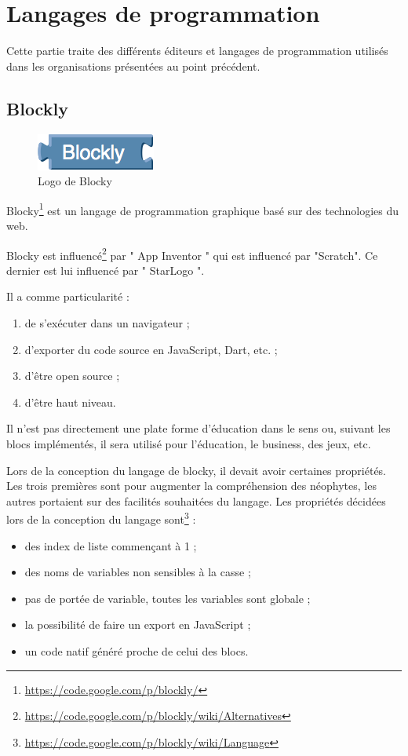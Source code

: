 ﻿\section{Langages de programmation}
Cette partie traite des différents éditeurs et langages de programmation utilisés dans les organisations présentées au point précédent.
\subsection{Blockly}
\label{blockly}
\begin{figure}[!h]
  \begin{center}
    \includegraphics[scale=0.5]{content/5-related_work/images/blocky}
    \caption{Logo de Blocky}
    \label{fig:blocky}
  \end{center}
\end{figure}
Blocky\footnote{\url{https://code.google.com/p/blockly/}} est un langage de programmation graphique basé sur des technologies du web. 

Blocky est influencé\footnote{\url{https://code.google.com/p/blockly/wiki/Alternatives}} par " App Inventor " qui est influencé par "Scratch". Ce dernier est lui influencé par " StarLogo ".

Il a comme particularité :
\begin{enumerate}
\item de s'exécuter dans un navigateur ;
\item d'exporter du code source en JavaScript, Dart, etc. ;
\item d'être open source ;
\item d'être haut niveau.
\end{enumerate}

Il n'est pas directement une plate forme d'éducation dans le sens ou, suivant les blocs implémentés, il sera utilisé pour l'éducation, le business, des jeux, etc.

Lors de la conception du langage de blocky, il devait avoir certaines propriétés. Les trois premières sont pour augmenter la compréhension des néophytes, les autres portaient sur des facilités souhaitées du langage. Les propriétés décidées lors de la conception du langage sont\footnote{\url{https://code.google.com/p/blockly/wiki/Language}} :

\begin{itemize}
  \item des index de liste commençant à 1 ;
  \item des noms de variables non sensibles à la casse ;
  \item pas de portée de variable, toutes les variables sont globale ;
  \item la possibilité de faire un export en JavaScript ;
  \item un code natif généré proche de celui des blocs.
\end{itemize}

